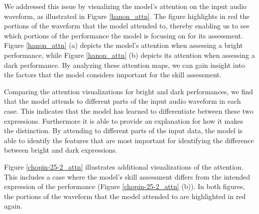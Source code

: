 \documentclass[manuscript,review,anonymous]{acmart}
\begin{document}
We addressed this issue by visualizing the model's attention on the input audio waveform, as illustrated in Figure \ref{hanon_attn}. 
The figure highlights in red the portions of the waveform that the model attended to, thereby enabling us to see which portions of the performance the model is focusing on for its assessment. 
Figure \ref{hanon_attn} (a) depicts the model's attention when assessing a bright performance, while Figure \ref{hanon_attn} (b) depicts its attention when assessing a dark performance. 
By analyzing these attention maps, we can gain insight into the factors that the model considers important for the skill assessment.

Comparing the attention visualizations for bright and dark performances, we find that the model attends to different parts of the input audio waveform in each case. 
This indicates that the model has learned to differentiate between these two expressions.
Furthermore it is able to provide an explanation for how it makes the distinction. 
By attending to different parts of the input data, the model is able to identify the features that are most important for identifying the difference between bright and dark expressions. 

Figure \ref{chopin-25-2_attn} illustrates additional visualizations of the attention.
This includes a case where the model's skill assessment differs from the intended expression of the performance (Figure \ref{chopin-25-2_attn} (b)). 
In both figures, the portions of the waveform that the model attended to are highlighted in red again.  


\end{document}
